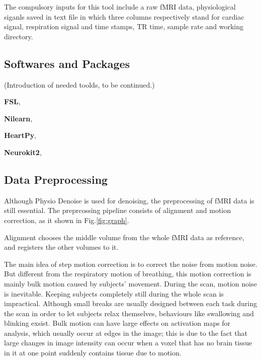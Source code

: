 The compulsory inputs for this tool include a raw fMRI data, 
physiological siganls saved in text file in which three columns respectively stand for cardiac signal, 
respiration signal and time stamps,
TR time, sample rate and working directory.

\subsection{Softwares and Packages}

(Introduction of needed toolds, to be continued.)

\textbf{FSL},

\textbf{Nilearn},


\textbf{HeartPy}\cite{van2019heartpy},

\textbf{Neurokit2}\cite{Makowski2021neurokit},

\subsection{Data Preprocessing}

Although Physio Denoise is used for denoising, the preprocessing of fMRI data is still essential.
The preprcossing pipeline consists of alignment and motion correction, as it shown in Fig.\ref{fig:graph}.

Alignment chooses the middle volume from the whole fMRI data as reference, and registers the other
volumes to it. 

The main idea of step motion correction is to correct the noise from motion noise. 
But different from the respiratory motion of breathing, this motion correction
is mainly bulk motion caused by subjects' movement. During the scan, motion noise is inevitable. 
Keeping subjects completely still during the whole scan is impractical.
Although small breaks are usually designed between each task during the scan in order to let subjects relax themselves, 
behaviours like swallowing and blinking exsist.
Bulk motion can have large effects on activation maps for analysis, 
which usually occur at edges in the image; 
this is due to the fact that large changes in image intensity can occur 
when a voxel that has no brain tissue in it at one point 
suddenly contains tissue due to motion.\cite{poldrack2011handbook}


